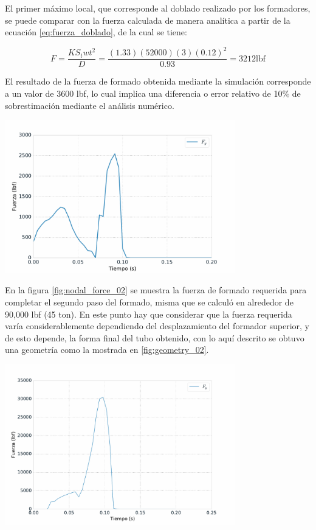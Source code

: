 El primer máximo local, que corresponde al doblado realizado por los formadores, se puede 
comparar con la fuerza calculada de manera analítica a partir de la ecuación \ref{eq:fuerza_doblado}, 
de la cual se tiene:

$$
F = \frac{K S_{t} w t^2}{D} = \frac{(1.33)(52000)(3)(0.12)^2}{0.93} = 3212 \text{lbf}
$$

El resultado de la fuerza de formado obtenida mediante la simulación corresponde a un valor de 
3600 lbf, lo cual implica una diferencia o error relativo de 10\% de sobrestimación mediante 
el análisis numérico.

\begin{center}
\includegraphics[width=0.75\textwidth]{src/ch4/nodal_force_01.pdf}
\label{fig:nodal_force_01}
\end{center}

En la figura \ref{fig:nodal_force_02} se muestra la fuerza de formado requerida para completar el 
segundo paso del formado, misma que se calculó en alrededor de 90,000 lbf (45 ton). En este punto 
hay que considerar que la fuerza requerida varía considerablemente dependiendo del desplazamiento 
del formador superior, y de esto depende, la forma final del tubo obtenido, con lo aquí descrito se 
obtuvo una geometría como la mostrada en \ref{fig:geometry_02}.

\begin{center}
\includegraphics[width=0.75\textwidth]{src/ch4/nodal_force_02.pdf}
\label{fig:nodal_force_02}
\end{center}

